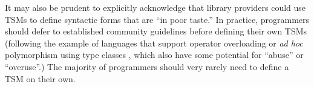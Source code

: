It may also be prudent to explicitly acknowledge that library providers could use TSMs  to define syntactic forms that are ``in poor taste.'' In practice, programmers should defer to established community guidelines before defining their own TSMs (following the example of languages that support operator overloading or \emph{ad hoc} polymorphism using type classes \cite{Hall:1996:TCH:227699.227700,conf/popl/DreyerHCK07}, which also have some potential for ``abuse'' or ``overuse''.) %
The majority of programmers should very rarely need to define a TSM on their own.


